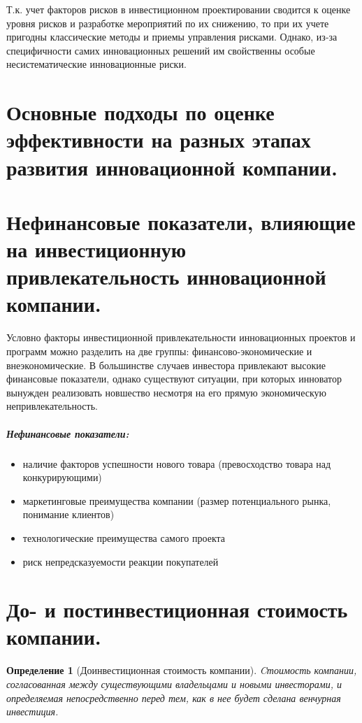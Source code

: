 \documentclass[11pt]{article}
\theoremstyle{plain} %
\newtheorem{proposition}[theorem]{Определение}
\theoremstyle{definition} %
\theoremstyle{remark} %
\begin{document}
Т.к. учет факторов рисков в инвестиционном проектировании сводится к оценке уровня рисков и разработке мероприятий по их снижению, то при  их  учете  пригодны  классические  методы  и  приемы  управления  рисками. Однако,  из-за  специфичности  самих  инновационных  решений  им  свойственны особые   несистематические   инновационные   риски.

\newpage

\section{Основные подходы по оценке эффективности на разных этапах развития инновационной компании.}\label{erste}

\newpage

\section{Нефинансовые показатели, влияющие на инвестиционную привлекательность инновационной компании.}\label{erste}

Условно факторы инвестиционной привлекательности инновационных проектов и программ можно разделить на две группы: финансово-экономические и внеэкономические. В большинстве случаев инвестора привлекают высокие финансовые показатели, однако существуют ситуации, при которых инноватор вынужден реализовать новшество несмотря на его прямую экономическую непривлекательность.

\subparagraph{Нефинансовые показатели:}
\begin{itemize}
	\item наличие  факторов успешности нового товара (превосходство товара над конкурирующими)
	\item маркетинговые   преимущества   компании (размер   потенциального   рынка, понимание клиентов)
	\item технологические преимущества самого проекта
	\item риск непредсказуемости реакции покупателей
\end{itemize}

\newpage

\section{До- и постинвестиционная стоимость компании.}\label{erste}

\begin{proposition}[Доинвестиционная стоимость компании]
	Cтоимость компании, согласованная между существующими   владельцами   и   новыми   инвесторами,   и определяемая непосредственно перед тем, как в нее будет сделана венчурная инвестиция.
\end{proposition}
\end{document}

